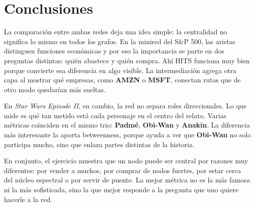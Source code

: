 \section{Conclusiones}

La comparaci\'on entre ambas redes deja una idea simple: la centralidad no significa lo mismo en todos los grafos. En la minired del S\&P 500, las aristas distinguen funciones econ\'omicas y por eso la importancia se parte en dos preguntas distintas: qui\'en abastece y qui\'en compra. Ah\'i HITS funciona muy bien porque convierte esa diferencia en algo visible. La intermediaci\'on agrega otra capa al mostrar qu\'e empresas, como \textbf{AMZN} o \textbf{MSFT}, conectan rutas que de otro modo quedar\'ian m\'as sueltas.

En \textit{Star Wars Episode II}, en cambio, la red no separa roles direccionales. Lo que mide es qu\'e tan metido est\'a cada personaje en el centro del relato. Varias m\'etricas coinciden en el mismo trio: \textbf{Padm\'e}, \textbf{Obi-Wan} y \textbf{Anakin}. La diferencia m\'as interesante la aporta betweenness, porque ayuda a ver que \textbf{Obi-Wan} no solo participa mucho, sino que enlaza partes distintas de la historia.

En conjunto, el ejercicio muestra que un nodo puede ser central por razones muy diferentes: por vender a muchos, por comprar de nodos fuertes, por estar cerca del n\'ucleo espectral o por servir de puente. La mejor m\'etrica no es la m\'as famosa ni la m\'as sofisticada, sino la que mejor responde a la pregunta que uno quiere hacerle a la red.
